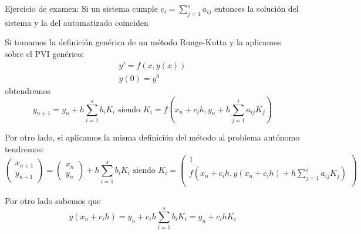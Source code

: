 \begin{problem}Ejercicio de examen: Si un sistema cumple $c_i = \sum_{j=1}^sa_{ij}$ entonces la solución del sistema y la del automatizado coinciden

\solution


Si tomamos la definición genérica de un método Runge-Kutta y la aplicamos sobre el PVI genérico:
\[\begin{array}{l}
y'=f(x,y(x))\\
y(0)=y^0
\end{array}\]
obtendremos
\[y_{n+1} = y_n+ h \sum_{i=1}^s b_i K_i \text{ siendo } K_i = f\left(x_n+c_ih, y_n+h \sum_{j=1}^ia_{ij}K_j\right)\]

Por otro lado, si aplicamos la misma definición del método al problema autónomo tendremos:
\[\left(\begin{array}{c}
x_{n+1} \\ y_{n+1}
\end{array} \right) = \left(\begin{array}{c}
x_n \\ y_{n}
\end{array} \right) + h \sum_{i=1}^sb_iK_i \text{ siendo } K_i=\left(\begin{array}{c}
1 \\ f\left(x_n+c_ih, y(x_n+c_ih)+h \sum_{j=1}^ia_{ij}K_j\right)\\
\end{array} \right)\]

Por otro lado sabemos que
\[y(x_n+c_ih) = y_n+c_ih\sum_{i=1}^s b_i K_i = y_n+c_ihK_i\]

\end{problem}

